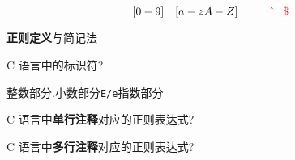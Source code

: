 \begin{frame}{}
\end{frame}

\begin{frame}{}
  \[
    [0-9] \quad [a-zA-Z] \qquad \textcolor{red}{\hat\qquad \$}
  \]
\end{frame}

\begin{frame}{}
  \begin{center}
    {\bf 正则定义}与简记法
  \end{center}

\end{frame}

\begin{frame}{}
  \begin{center}
    C 语言中的标识符?
  \end{center}

  \pause
\end{frame}{}

\begin{frame}{}
  \begin{center}
    整数部分$.$小数部分\texttt{E/e}指数部分
  \end{center}

  \pause
\end{frame}{}

\begin{frame}{}
  \begin{center}
    C 语言中{\bf 单行注释}对应的正则表达式?
  \end{center}

  \pause
\end{frame}

\begin{frame}{}
  \begin{center}
    C 语言中{\bf 多行注释}对应的正则表达式?
  \end{center}

  \pause
\end{frame}

